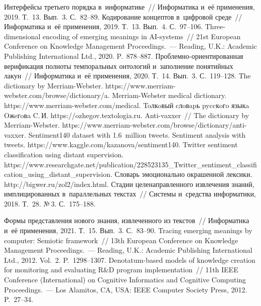\begin{multicols}{2}
{{\begin{thebibliography}{99}
 Интерфейсы третьего порядка в~информатике~// Информатика и~её 
применения, 2019. Т.~13. Вып.~3. С.~82--89.
 Кодирование концептов в~цифровой среде~// Информатика и~её применения, 
2019. Т.~13. Вып.~4. С.~97--106.
 Three-dimensional encoding of emerging meanings in AI-systems~// 21st European 
Conference on Knowledge Management Proceedings.~--- Reading, U.K.: Academic Publishing 
International Ltd., 2020. P.~878--887.
 Проб\-лем\-но-ори\-ен\-ти\-ро\-ван\-ная верификация полноты темпоральных 
онтологий и~заполнение понятийных лакун~// Информатика и~её применения, 2020. Т.~14. 
Вып.~3. С.~119--128.
The dictionary by Merriam-Webster. {\sf https://www.\linebreak  merriam-webster.com/browse/dictionary/a}.
Merriam-Webster medical dictionary. {\sf https://www.\linebreak merriam-webster.com/medical}.
Toлкoвый cлoвapь pyccкoгo языкa Oжeгoвa C.\,И. {\sf https://ozhegov.textologia.ru}.
Anti-vaxxer~// The dictionary by Merriam-Webster. {\sf  
https://www.merriam-webster.com/browse/dictionary/\linebreak anti-vaxxer}.
Sentiment140 dataset with 1.6~million tweets. Sentiment analysis with tweets.  {\sf 
https://www.kaggle.com/\linebreak kazanova/sentiment140}.
 Twitter sentiment classification using distant supervision. {\sf 
https://www.\linebreak researchgate.net/publication/228523135\_Twitter\_\linebreak sentiment\_classification\_using\_distant\_supervision.}
Словарь эмоционально окрашенной лексики. {\sf http://bigwer.ru/zol2/index.html}.
 Стадии целенаправленного извлечения знаний, имплицированных 
в~параллельных текстах~// Системы и~средства информатики, 2018. Т.~28. №\,3. С.~175--188.

\columnbreak

 Формы представления нового знания, извлеченного из текстов~// 
Информатика и~её применения, 2021. Т.~15. Вып.~3. С.~83--90.
 Tracing emerging meanings by computer: Semiotic framework~// 13th European 
Conference on Knowledge Management Proceedings.~--- Reading, U.K.: Academic Publishing 
International Ltd., 2012. Vol.~2. P.~1298--1307.
 Denotatum-based models of knowledge creation for monitoring and evaluating R\&D 
program implementation~// 11th IEEE Conference (International) on Cognitive Informatics and 
Cognitive Computing Proceedings.~--- Los Alamitos, CA, USA: IEEE Computer Society Press, 2012. 
P.~27--34.
\end{thebibliography}

 }
 }

\end{multicols}

